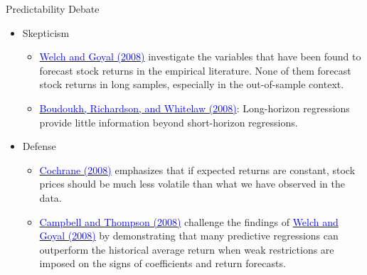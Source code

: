 \documentclass{beamer}
\begin{document}
\begin{frame}{Predictability Debate}
	\begin{itemize}
		\item Skepticism
		\begin{itemize}
			\item \href{https://doi.org/10.1093/rfs/hhm014}{\textcolor{blue}{Welch and Goyal (2008)}} investigate the variables that have been found
			to forecast stock returns in the empirical literature. None of them forecast
			stock returns in long samples, especially in the out-of-sample context.
			\item \href{https://doi.org/10.1093/rfs/hhl042}{\textcolor{blue}{Boudoukh, Richardson, and Whitelaw (2008)}}: Long-horizon
			regressions provide little information beyond short-horizon regressions.
		\end{itemize}
		\item Defense
		\begin{itemize}
			\item \href{https://doi.org/10.1093/rfs/hhm046}{\textcolor{blue}{Cochrane (2008)}} emphasizes that if expected returns are constant, stock prices should be much less volatile than what we have observed in the data.
                \item \href{https://doi.org/10.1093/rfs/hhm055}{\textcolor{blue}{Campbell and Thompson (2008)}} challenge the findings of \href{https://doi.org/10.1093/rfs/hhm014}{\textcolor{blue}{Welch and Goyal (2008)}} by demonstrating that many predictive regressions can outperform the historical average return when weak restrictions are imposed on the signs of coefficients and return forecasts. 
		\end{itemize}
	\end{itemize}
\end{frame}
\end{document}
